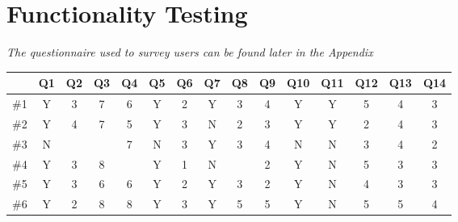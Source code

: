 

\section{Functionality Testing}
\emph{The questionnaire used to survey users can be found later in the
Appendix}

\begin{center}
\begin{tabular}{l || c | c | c | c | c | c | c | c | c | c | c | c | c | c}
   & Q1 & Q2 & Q3 & Q4 & Q5 & Q6 & Q7 & Q8 & Q9 & Q10 & Q11 & Q12 & Q13 & Q14 \\
\hline
\#1 & Y  & 3  & 7  & 6  & Y  & 2  & Y  & 3  & 4  & Y   & Y   & 5   & 4   & 3  \\
\#2 & Y  & 4  & 7  & 5  & Y  & 3  & N  & 2  & 3  & Y   & Y   & 2   & 4   & 3  \\
\#3 & N  &    &    & 7  & N  & 3  & Y  & 3  & 4  & N   & N   & 3   & 4   & 2  \\
\#4 & Y  & 3  & 8  &    & Y  & 1  & N  &    & 2  & Y   & N   & 5   & 3   & 3  \\
\#5 & Y  & 3  & 6  & 6  & Y  & 2  & Y  & 3  & 2  & Y   & N   & 4   & 3   & 3  \\
\#6 & Y  & 2  & 8  & 8  & Y  & 3  & Y  & 5  & 5  & Y   & N   & 5   & 5   & 4  \\
\end{tabular}
\end{center}

